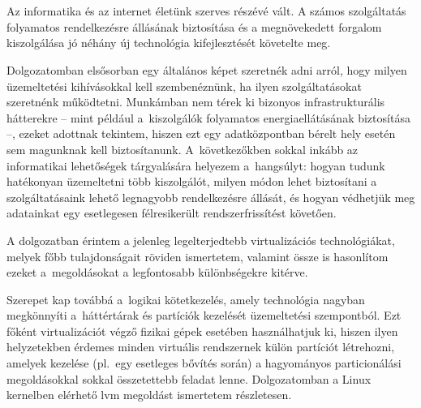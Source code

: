 \chapter{\bevezetes}

%

Az informatika és az internet életünk szerves részévé vált. A számos szolgáltatás folyamatos rendelkezésre állásának biztosítása és a megnövekedett forgalom kiszolgálása jó néhány új technológia kifejlesztését követelte meg.

Dolgozatomban elsősorban egy általános képet szeretnék adni arról, hogy milyen üzemeltetési kihívásokkal kell szembenéznünk, ha ilyen szolgáltatásokat szeretnénk működtetni. Munkámban nem térek ki bizonyos infrastrukturális hátterekre -- mint például a~kiszolgálók folyamatos energiaellátásának biztosítása --, ezeket adottnak tekintem, hiszen ezt egy adatközpontban bérelt hely esetén sem magunknak kell biztosítanunk. A~következőkben sokkal inkább az informatikai lehetőségek tárgyalására helyezem a~hangsúlyt: hogyan tudunk hatékonyan üzemeltetni több kiszolgálót, milyen módon lehet biztosítani a szolgáltatásaink lehető legnagyobb rendelkezésre állását, és hogyan védhetjük meg adatainkat egy esetlegesen félresikerült rendszerfrissítést követően.

A dolgozatban érintem a jelenleg legelterjedtebb virtualizációs technológiákat, melyek főbb tulajdonságait röviden ismertetem, valamint össze is hasonlítom ezeket a~megoldásokat a legfontosabb különbségekre kitérve.

Szerepet kap továbbá a~logikai kötetkezelés, amely technológia nagyban megkönnyíti a~háttértárak és partíciók kezelését üzemeltetési szempontból. Ezt főként virtualizációt végző fizikai gépek esetében használhatjuk ki, hiszen ilyen helyzetekben érdemes minden virtuális rendszernek külön partíciót létrehozni, amelyek kezelése (pl.~egy esetleges bővítés során) a hagyományos particionálási megoldásokkal sokkal összetettebb feladat lenne. Dolgozatomban a Linux kernelben elérhető \acrfull{lvm} megoldást ismertetem részletesen. 

